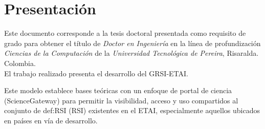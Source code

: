 \part*{Presentación}\label{parte:Presentacion}

Este documento corresponde a la tesis doctoral presentada como requisito de grado para obtener el título de \textit{Doctor en Ingeniería} en la línea de profundización \textit{Ciencias de la Computación} de la \textit{Universidad Tecnológica de Pereira}, Risaralda. Colombia.\\

El trabajo realizado presenta el desarrollo del \acrfull{GRSI-ETAI}.

 Este modelo establece bases teóricas con un enfoque de portal de ciencia (\gls{ScienceGateway}) para permitir la visibilidad, acceso y uso compartidos al conjunto de \gls{def:RSI} (\acrshort{RSI}) existentes en el \acrfull{ETAI}, especialmente aquellos ubicados en países en vía de desarrollo.  \\



